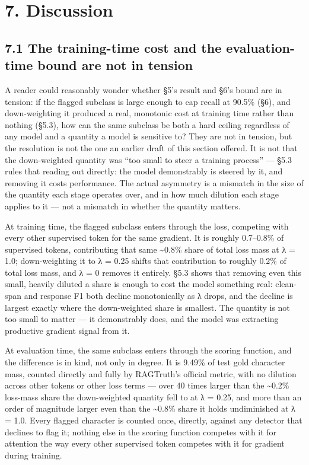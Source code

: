 \documentclass[11pt]{article}
\begin{document}
\section{7. Discussion}\label{discussion}

\subsection{7.1 The training-time cost and the evaluation-time bound are not in tension}\label{the-training-time-cost-and-the-evaluation-time-bound-are-not-in-tension}

A reader could reasonably wonder whether §5's result and §6's bound are in tension: if the
flagged subclass is large enough to cap recall at 90.5\% (§6), and down-weighting it produced
a real, monotonic cost at training time rather than nothing (§5.3), how can the same
subclass be both a hard ceiling regardless of any model and a quantity a model is sensitive
to? They are not in tension, but the resolution is not the one an earlier draft of this
section offered. It is not that the down-weighted quantity was ``too small to steer a
training process'' --- §5.3 rules that reading out directly: the model demonstrably is
steered by it, and removing it costs performance. The actual asymmetry is a mismatch in the
size of the quantity each stage operates over, and in how much dilution each stage applies
to it --- not a mismatch in whether the quantity matters.

At training time, the flagged subclass enters through the loss, competing with every other
supervised token for the same gradient. It is roughly 0.7--0.8\% of supervised tokens,
contributing that same \textasciitilde0.8\% share of total loss mass at λ = 1.0; down-weighting it to
λ = 0.25 shifts that contribution to roughly 0.2\% of total loss mass, and λ = 0 removes it
entirely. §5.3 shows that removing even this small, heavily diluted a share is enough to
cost the model something real: clean-span and response F1 both decline monotonically as λ
drops, and the decline is largest exactly where the down-weighted share is smallest. The
quantity is not too small to matter --- it demonstrably does, and the model was extracting
productive gradient signal from it.

At evaluation time, the same subclass enters through the scoring function, and the
difference is in kind, not only in degree. It is 9.49\% of test gold character mass, counted
directly and fully by RAGTruth's official metric, with no dilution across other tokens or
other loss terms --- over 40 times larger than the \textasciitilde0.2\% loss-mass share the down-weighted
quantity fell to at λ = 0.25, and more than an order of magnitude larger even than the
\textasciitilde0.8\% share it holds undiminished at λ = 1.0. Every flagged character is counted once,
directly, against any detector that declines to flag it; nothing else in the scoring
function competes with it for attention the way every other supervised token competes with
it for gradient during training.
\end{document}
